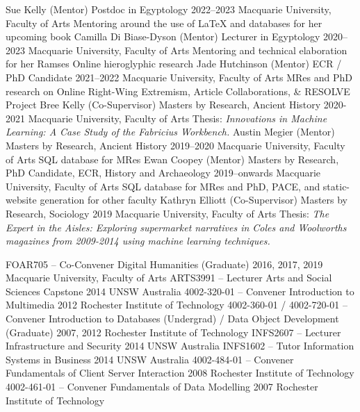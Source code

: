 \begin{cventries}
\cventry
    {Sue Kelly (Mentor)}
    {Postdoc in Egyptology}
    {2022--2023}
    {Macquarie University, Faculty of Arts}
    {Mentoring around the use of \LaTeX{} and databases for her upcoming book}
\cventry
    {Camilla Di Biase-Dyson (Mentor)}
    {Lecturer in Egyptology}
    {2020--2023}
    {Macquarie University, Faculty of Arts}
    {Mentoring and technical elaboration for her Ramses Online hieroglyphic research}
\cventry
    {Jade Hutchinson (Mentor)}
    {ECR / PhD Candidate}
    {2021--2022}
    {Macquarie University, Faculty of Arts}
    {MRes and PhD research on Online Right-Wing Extremism, Article Collaborations, \& RESOLVE Project}
\cventry
    {Bree Kelly (Co-Supervisor)}
    {Masters by Research, Ancient History}
    {2020-2021}
    {Macquarie University, Faculty of Arts}
    {Thesis: \textit{Innovations in Machine Learning: A Case Study of the Fabricius Workbench.}}
\cventry
    {Austin Megier (Mentor)}
    {Masters by Research, Ancient History}
    {2019--2020}
    {Macquarie University, Faculty of Arts}
    {SQL database for MRes}
\cventry
    {Ewan Coopey (Mentor)}
    {Masters by Research, PhD Candidate, ECR, History and Archaeology}
    {2019--onwards}
    {Macquarie University, Faculty of Arts}
    {SQL database for MRes and PhD, PACE, and static-website generation for other faculty}        
\cventry
    {Kathryn Elliott (Co-Supervisor)}
    {Masters by Research, Sociology}
    {2019}
    {Macquarie University, Faculty of Arts}
    {Thesis: \textit{The Expert in the Aisles: Exploring
supermarket narratives in Coles and Woolworths magazines from 2009-2014 using machine learning techniques.}}
    
\end{cventries}





\begin{cventries}
\cventry
    {FOAR705 -- Co-Convener}
    {Digital Humanities (Graduate)}
    {2016, 2017, 2019}
    {Macquarie University, Faculty of Arts}
    {}
\cventry
    {ARTS3991 -- Lecturer}
    {Arts and Social Sciences Capstone}
    {2014}
    {UNSW Australia}
    {}  
\cventry
    {4002-320-01 -- Convener}
    {Introduction to Multimedia}
    {2012}
    {Rochester Institute of Technology}
    {}  
\cventry
    {4002-360-01 / 4002-720-01 -- Convener}
    {Introduction to Databases (Undergrad) / Data Object Development (Graduate)}
    {2007, 2012}
    {Rochester Institute of Technology}
    {}   
\cventry
    {INFS2607 -- Lecturer}
    {Infrastructure and Security}
    {2014}
    {UNSW Australia}
    {}     
\cventry
    {INFS1602 -- Tutor}
    {Information Systems in Business}
    {2014}
    {UNSW Australia}
    {}    
\cventry
    {4002-484-01 -- Convener}
    {Fundamentals of Client Server Interaction}
    {2008}
    {Rochester Institute of Technology}
    {}      
\cventry
    {4002-461-01 -- Convener}
    {Fundamentals of Data Modelling}
    {2007}
    {Rochester Institute of Technology}
    {}     
\end{cventries}


